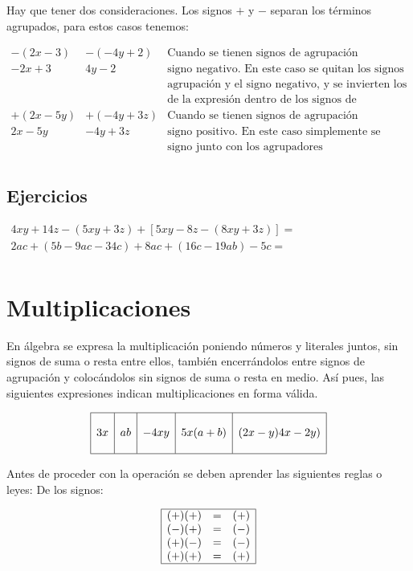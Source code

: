 Hay que tener dos consideraciones. Los signos $+$ y $-$ separan los términos agrupados, para estos casos tenemos:
\begin{center}
$
\begin{array}{ccl}
-(2x-3) & -(-4y+2) & \text{Cuando se tienen signos de agrupación precedidos por}\\
-2x+3 & 4y-2 & \text{signo negativo. En este caso se quitan los signos de}\\
& & \text{agrupación y el signo negativo, y se invierten los signos}\\
 & & \text{de la expresión dentro de los signos de agrupación.}\\
\hline
+(2x-5y) & +(-4y+3z) & \text{Cuando se tienen signos de agrupación precedidos por}\\
2x-5y & -4y+3z & \text{signo positivo. En este caso simplemente se quita el}\\
 & & \text{signo junto con los agrupadores}\\

\end{array}
$
\end{center}
\subsection{Ejercicios}
$
\begin{array}{l}
4xy+14z-(5xy+3z)+[5xy-8z-(8xy+3z)]=\\
2ac+(5b-9ac-34c)+8ac+(16c-19ab)-5c=\\
\end{array}
$

\section{Multiplicaciones}
En álgebra se expresa la multiplicación poniendo números y literales juntos, sin signos de suma o resta entre ellos, también encerrándolos entre signos de agrupación y colocándolos sin signos de suma o resta en medio. Así pues, las siguientes expresiones indican multiplicaciones en forma válida.
\begin{center}
$$
\begin{array}{|c|c|c|c|c|}
\hline
 & & & & \\
3x & ab & -4xy & 5x(a+b) & (2x-y)4x-2y)\\
 & & & & \\
\hline
\end{array}
$$
\end{center}
Antes de proceder con la operación se deben aprender las siguientes reglas o leyes:
De los signos:
\begin{center}
$$
\begin{array}{|lcr|}
\hline
(+)(+) & = & (+)\\
(-)(+) & = & (-)\\
(+)(-) & = & (-)\\
(+)(+) & = & (+)\\
\hline
\end{array}
$$
\end{center}

